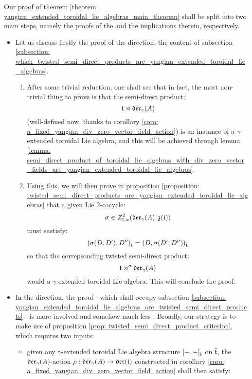         Our proof of theorem \ref{theorem: yangian_extended_toroidal_lie_algebras_main_theorem} shall be split into two main steps, namely the proofs of the  and the  implications therein, respectively.
        \begin{itemize}
            \item Let us discuss firstly the proof of the  direction, the content of subsection \ref{subsection: which_twisted_semi_direct_products_are_yangian_extended_toroidal_lie_algebras}.
            \begin{enumerate}
                \item After some trivial reduction, one shall see that in fact, the most non-trivial thing to prove is that the semi-direct product:
                    $$\mathfrak{t} \rtimes \mathfrak{der}_{\gamma}(A)$$
                (well-defined now, thanks to corollary \ref{coro: a_fixed_yangian_div_zero_vector_field_action}) is an instance of a $\gamma$-extended toroidal Lie algebra, and this will be achieved through lemma \ref{lemma: semi_direct_product_of_toroidal_lie_algebras_with_div_zero_vector_fields_are_yangian_extended_toroidal_lie_algebras}. \item Using this, we will then prove in proposition \ref{proposition: twisted_semi_direct_products_are_yangian_extended_toroidal_lie_algebras} that a given Lie $2$-cocycle:
                    $$\sigma \in Z^2_{\mathrm{Lie}}(\mathfrak{der}_{\gamma}(A), \mathfrak{z}(\mathfrak{t}))$$
                must sastisfy:
                    $$( \sigma(D, D'), D'' )_{\hat{\mathfrak{t}}} = ( D, \sigma(D', D'') )_{\hat{\mathfrak{t}}}$$
                so that the correpsonding twisted semi-direct product:
                    $$\mathfrak{t} \rtimes^{\sigma} \mathfrak{der}_{\gamma}(A)$$
                would a $\gamma$-extended toroidal Lie algebra. This will conclude the proof.
            \end{enumerate}
            \item In the  direction, the proof - which shall occupy subsection \ref{subsection: yangian_extended_toroidal_lie_algebras_are_twisted_semi_direct_products} - is more involved and somehow much less . Broadly, our strategy is to make use of proposition \ref{prop: twisted_semi_direct_product_criterion}, which requires two inputs:
            \begin{itemize}
                \item given any $\gamma$-extended toroidal Lie algebra structure $[-, -]_{\hat{\mathfrak{t}}}$ on $\hat{\mathfrak{t}}$, the $\mathfrak{der}_{\gamma}(A)$-action $\rho: \mathfrak{der}_{\gamma}(A) \to \mathfrak{der}(\mathfrak{t})$ constructed in corollary \ref{coro: a_fixed_yangian_div_zero_vector_field_action} shall then satisfy:

\end{itemize}
\end{itemize}
